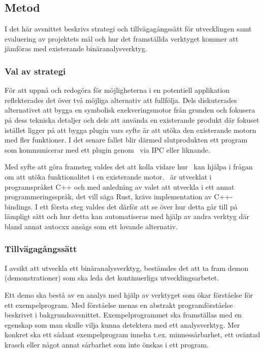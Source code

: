\subsection{Metod}

I det här avsnittet beskrivs strategi och tillvägagångssätt för utvecklingen
samt evaluering av projektets mål och hur det framställda verktyget kommer att
jämföras med existerande binäranalysverktyg.

\subsubsection{Val av strategi}

För att uppnå och redogöra för möjligheterna i en potentiell applikation
reflekterades det över två möjliga alternativ att fullfölja. Dels diskuterades
alternativet att bygga en symbolisk exekveringsmotor från grunden och fokusera
på dess tekniska detaljer och dels att använda en existerande produkt där
fokuset istället ligger på att bygga plugin vars syfte är att utöka den
existerande motorn med fler funktioner. I det senare fallet blir därmed
slutprodukten ett program som kommunicerar med ett plugin genom \stoe\ via IPC
eller liknande. 

Med syfte att göra framsteg valdes det att kolla vidare hur \stoe\ kan hjälpa i
frågan om att utöka funktionalitet i en existerande motor. \stoe\ är utvecklat
i programspråket C++ och med anledning av valet att utveckla i ett
annat programmeringsspråk, det vill säga Rust, krävs implementation av
C++-bindings. I ett första steg valdes det därför att se över hur detta går till
på lämpligt sätt och hur detta kan automatiseras med hjälp av andra verktyg
där bland annat autocxx ansågs som ett lovande alternativ.

\subsubsection{Tillvägagångssätt}

I avsikt att utveckla ett binäranalysverktyg, bestämdes det att ta fram demon
(demonstrationer) som ska leda det kontinuerliga utvecklingsarbetet.

Ett demo ska bestå av en analys med hjälp av verktyget som ökar förståelse för
ett exempelprogram. Med förståelse menas en abstrakt programförståelse
beskrivet i bakgrundsavsnittet. Exempelprogrammet ska framställas med en
egenskap som man skulle vilja kunna detektera med ett analysverktyg. Mer
konkret ska ett sådant exempelprogram inneha t.ex. minnessårbarhet, ett oväntad
krasch eller något annat sårbarhet som inte önskas i ett program.

